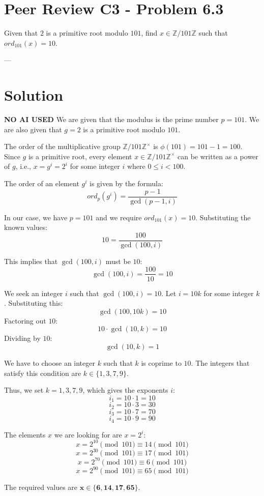 \documentclass[a4paper,12pt]{article}
\begin{document}
\section*{Peer Review C3 - Problem 6.3}

Given that $2$ is a primitive root modulo $101$, find $x \in \mathbb{Z}/101\mathbb{Z}$ such that $ord_{101}(x)=10$.

---

\section*{Solution}

\textbf{NO AI USED}
We are given that the modulus is the prime number $p=101$.
We are also given that $g=2$ is a primitive root modulo $101$.

The order of the multiplicative group $\mathbb{Z}/101\mathbb{Z}^{\times}$ is $\phi(101) = 101-1 = 100$.
Since $g$ is a primitive root, every element $x \in \mathbb{Z}/101\mathbb{Z}^{\times}$ can be written as a power of $g$, i.e., $x = g^i = 2^i$ for some integer $i$ where $0 \le i < 100$.

The order of an element $g^i$ is given by the formula:
$$ord_{p}(g^{i})=\frac{p-1}{\gcd(p-1,i)}$$

In our case, we have $p=101$ and we require $ord_{101}(x)=10$. Substituting the known values:
$$10 = \frac{100}{\gcd(100,i)}$$

This implies that $\gcd(100,i)$ must be $10$:
$$\gcd(100,i) = \frac{100}{10} = 10$$

We seek an integer $i$ such that $\gcd(100, i) = 10$.
Let $i = 10k$ for some integer $k$. Substituting this:
$$\gcd(100, 10k) = 10$$
Factoring out $10$:
$$10 \cdot \gcd(10, k) = 10$$
Dividing by $10$:
$$\gcd(10, k) = 1$$

We have to choose an integer $k$ such that $k$ is coprime to $10$.
The integers that satisfy this condition are $k \in \{1, 3, 7, 9\}$.

Thus, we set $k=1, 3, 7, 9$, which gives the exponents $i$:
$$i_1 = 10 \cdot 1 = 10$$
$$i_2 = 10 \cdot 3 = 30 $$
$$i_3 = 10 \cdot 7 = 70 $$
$$i_4 = 10 \cdot 9 = 90 $$

The elements $x$ we are looking for are $x = 2^i$:
$$x = 2^{10} \pmod{101} \equiv 14 \pmod{101}$$
$$x = 2^{30} \pmod{101} \equiv 17 \pmod{101}$$
$$x = 2^{70} \pmod{101} \equiv 6 \pmod{101}$$
$$x = 2^{90} \pmod{101} \equiv 65 \pmod{101}$$

The required values are $\mathbf{x \in \{6, 14, 17, 65 \}}$.
\end{document}
